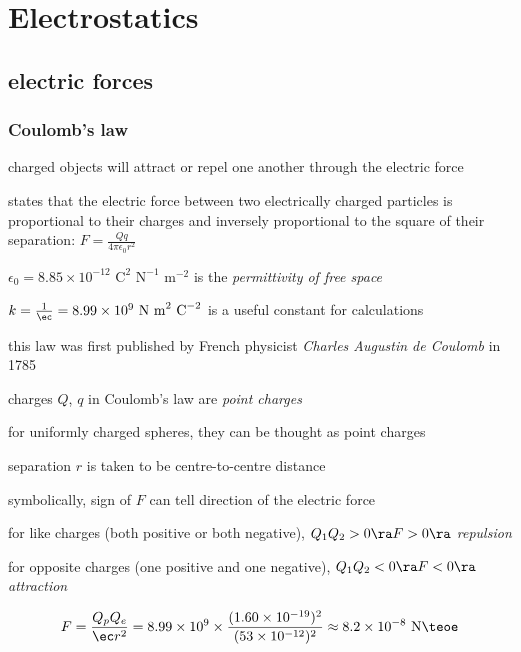\section{Electrostatics}

\subsection{electric forces}

\subsubsection{Coulomb's law}

charged objects will attract or repel one another through the electric force

\begin{ilight}
	 states that the electric force between two electrically charged particles is proportional to their charges and inversely proportional to the square of their separation: $\boxed{F = \frac{Qq}{4\pi\epsilon_0 r^2}}$
\end{ilight}

$\epsilon_0 = 8.85 \times 10^{-12} \text{ C}^2 \text{ N}^{-1} \text{ m}^{-2}$ is the \emph{permittivity of free space}

$k = \frac{1}{\ec} = 8.99 \times 10^9 \text{ N m}^2 \text{ C}^{-2}$ is a useful constant for calculations

this law was first published by French physicist \emph{Charles Augustin de Coulomb} in 1785

\cmt charges $Q$, $q$ in Coulomb's law are \emph{point charges}

\cmt for uniformly charged spheres, they can be thought as point charges

separation $r$ is taken to be centre-to-centre distance

\cmt symbolically, sign of $F$ can tell direction of the electric force

for like charges (both positive or both negative), $Q_1Q_2>0 \ra F>0 \ra$  \emph{repulsion}

for opposite charges (one positive and one negative), $Q_1Q_2<0 \ra F<0 \ra$  \emph{attraction}


\solc\begin{equation*}
	F = \frac{Q_p Q_e}{\ec r^2} = 8.99\times10^9 \times \frac{(1.60\times10^{-19})^2}{(53\times10^{-12})^2} \approx 8.2 \times 10^{-8} \text{ N} \teoe
\end{equation*}

